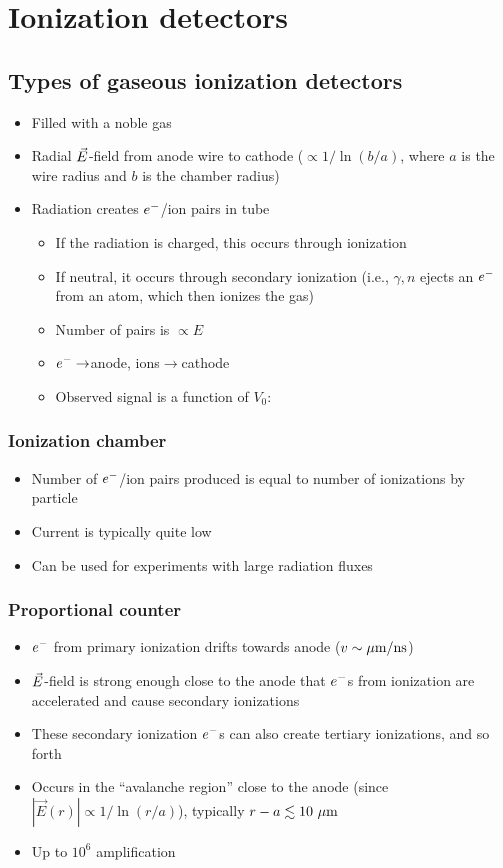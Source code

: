 \section{Ionization detectors}
\subsection{Types of gaseous ionization detectors}
\begin{itemize}
  \item Filled with a noble gas
  \item Radial $\vec{E}$-field from anode wire to cathode ($\propto 1/\ln(b/a)$, where $a$ is the wire radius and $b$ is the chamber radius)
  \item Radiation creates $e^{-}$/ion pairs in tube
  \begin{itemize}
    \item If the radiation is charged, this occurs through ionization
    \item If neutral, it occurs through secondary ionization (i.e., $\gamma,n$ ejects an $e^{-}$ from an atom, which then ionizes the gas)
    \item Number of pairs is $\propto E$
    \item $e^{-}\rightarrow$anode, ions$\rightarrow$cathode
    \item Observed signal is a function of $V_0$:
  \end{itemize}
\end{itemize}
\subsubsection{Ionization chamber}
\begin{itemize}
  \item Number of $e^{-}$/ion pairs produced is equal to number of ionizations by particle
  \item Current is typically quite low
  \item Can be used for experiments with large radiation fluxes
\end{itemize}
\subsubsection{Proportional counter}
\begin{itemize}
  \item $e^{-}$ from primary ionization drifts towards anode ($v\sim \mu\text{m}/\text{ns}$)
  \item $\vec{E}$-field is strong enough close to the anode that $e^{-}$s from ionization are accelerated and cause secondary ionizations
  \item These secondary ionization $e^{-}$s can also create tertiary ionizations, and so forth
  \item Occurs in the ``avalanche region'' close to the anode (since $|\vec E(r)|\propto 1/\ln(r/a)$), typically $r-a \lesssim 10~\mu\text{m}$
  \item Up to $10^6$ amplification
\end{itemize}
